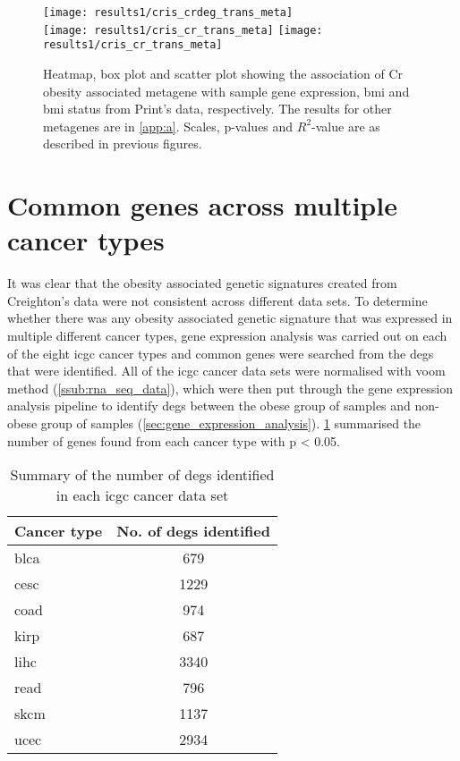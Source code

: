 \begin{figure}[htp!]
	\centering
	\texttt{[image: results1/cris\_crdeg\_trans\_meta]}\\
	\vspace{1em}
	\texttt{[image: results1/cris\_cr\_trans\_meta]}
	\hfill
	\texttt{[image: results1/cris\_cr\_trans\_meta]}
	\caption[Cr obesity associated metagene in Print's data]{Heatmap, box plot and scatter plot showing the association of Cr obesity associated metagene with sample gene expression, \gls{bmi} and \gls{bmi} status from Print's data, respectively.
	The results for other metagenes are in \cref{app:a}.
	Scales, p-values and $R^2$-value are as described in previous figures.}
	\label{fig:degmetaprint}
\end{figure}

\section{Common genes across multiple cancer types}
\label{sec:common_genes_across_multiple_cancer_types}

It was clear that the obesity associated genetic signatures created from Creighton's data were not consistent across different data sets.
To determine whether there was any obesity associated genetic signature that was expressed in multiple different cancer types, gene expression analysis was carried out on each of the eight \gls{icgc} cancer types and common genes were searched from the \glspl{deg} that were identified.
All of the \gls{icgc} cancer data sets were normalised with voom method (\cref{ssub:rna_seq_data}), which were then put through the gene expression analysis pipeline to identify \glspl{deg} between the obese group of samples and non-obese group of samples (\cref{sec:gene_expression_analysis}).
\cref{tab:icgcdegnum} summarised the number of genes found from each cancer type with p \textless{} 0.05.

\begin{table}[htbp]
	\centering
	\caption{Summary of the number of \glspl{deg} identified in each \gls{icgc} cancer data set}
	\label{tab:icgcdegnum}
	\begin{tabular}{lc}
		Cancer type & No. of \glspl{deg} identified\\
		\hline
		\rule{0pt}{2.25ex}\gls{blca} & 679 \\
		\gls{cesc} & 1229\\
		\gls{coad} & 974\\
		\gls{kirp} & 687\\
		\gls{lihc} & 3340\\
		\gls{read} & 796\\
		\gls{skcm} & 1137\\
		\gls{ucec} & 2934\\
		\hline
		\hline
	\end{tabular}
\end{table}

